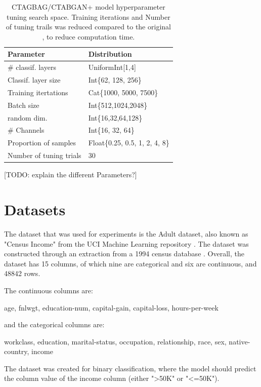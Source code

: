 \begin{table}[h]
	\centering
	\begin{tabular}{l | l }
		\hline
		Parameter               & Distribution                   \\
		\hline
		\# classif. layers      & UniformInt[1,4]                \\
		Classif. layer size     & Int\{62, 128, 256\}            \\
		Training itertations    & Cat\{1000, 5000, 7500\}        \\
		Batch size              & Int\{512,1024,2048\}           \\
		random dim.             & Int\{16,32,64,128\}            \\
		\# Channels             & Int\{16, 32, 64\}              \\
		Proportion of samples   & Float\{0.25, 0.5, 1, 2, 4, 8\} \\
		\hline
		Number of tuning trials & 30
	\end{tabular}
	\caption{CTAGBAG/CTABGAN+ model hyperparameter tuning search space. Training iterations and Number of tuning trails was reduced compared to the original \cite{kotelnikov2022TabDDPMModellingTabular}, to reduce computation time.}
	\label{tab:ctabgan_tune}
\end{table}

[TODO: explain the different Parameters?]


\section{Datasets}
\label{ch:methods-datasets}

The dataset that was used for experiments is the Adult dataset, also known as "Census Income" from the UCI Machine Learning repository \cite{Dua:2019}.
The dataset was constructed through an extraction from a 1994 census database \cite{kohavi1996ScalingAccuracyNaiveBayes}.
Overall, the dataset has 15 columns, of which nine are categorical and six are continuous, and 48842 rows.

The continuous columns are:

age, fnlwgt, education-num, capital-gain, capital-loss, hours-per-week

and the categorical columns are:

workclass, education, marital-status, occupation, relationship, race, sex, native-country, income

The dataset was created for binary classification, where the model should predict the column value of the income column (either ">50K" or "<=50K").

